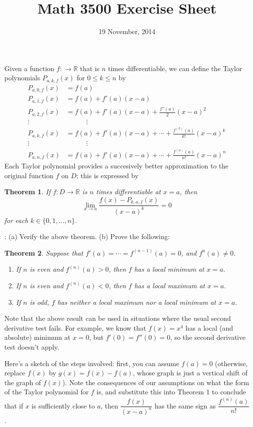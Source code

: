 \documentclass[letterpaper,12pt]{article}
\title{Math 3500 Exercise Sheet}
\date{19 November, 2014}
\newtheorem{theorem}{Theorem}
\newcommand{\R}{\mathbb{R}}
\begin{document}
\maketitle

Given a function $f:\to\R$ that is $n$ times differentiable, we can define the Taylor polynomials $P_{a,k,f}(x)$ for $0\leq k\leq n$ by
\begin{align*}
 P_{a,0,f}(x) &= f(a)\\
 P_{a,1,f}(x) &= f(a)+f'(a)(x-a)\\
 P_{a,2,f}(x) &= f(a)+f'(a)(x-a)+\frac{f''(a)}{2}(x-a)^2\\
 \vdots \quad & \quad \quad \quad \vdots \\
 P_{a,k,f}(x) &= f(a)+f'(a)(x-a)+\cdots+ \frac{f^{(k)}(a)}{k!}(x-a)^k\\
 \vdots \quad & \quad \quad \quad \vdots \\
 P_{a,n,f}(x) &= f(a)+f'(a)(x-a)+\cdots+ \frac{f^{(n)}(a)}{n!}(x-a)^n
\end{align*}
Each Taylor polynomial provides a succesively better approximation to the original function $f$ on $D$; this is expressed by
\begin{theorem}
 If $f:D\to\R$ is $n$ times differentiable at $x=a$, then
\[
 \lim_{x\to a}\frac{f(x)-P_{k,a,f}(x)}{(x-a)^k}=0
\]
for each $k\in\{0,1,\ldots, n\}$.
\end{theorem}
: (a) Verify the above theorem. (b) Prove the following:
\begin{theorem}
 Suppose that $f'(a)=\cdots = f^{(n-1)}(a)=0$, and $f^n(a)\neq 0$.
\begin{enumerate}
 \item If $n$ is even and $f^{(n)}(a)>0$, then $f$ has a local minimum at $x=a$.
 \item If $n$ is even and $f^{(n)}(a)<0$, then $f$ has a local maximum at $x=a$.
 \item If $n$ is odd, $f$ has neither a local maximum nor a local minimum at $x=a$.
\end{enumerate}
\end{theorem}
Note that the above result can be used in situations where the usual second derivative test fails. For example, we know that $f(x)=x^4$ has a local (and absolute) minimum at $x=0$, but $f'(0)=f''(0)=0$, so the second derivative test doesn't apply.

Here's a sketch of the steps involved: first, you can assume $f(a)=0$ (otherwise, replace $f(x)$ by $g(x)=f(x)-f(a)$, whose graph is just a vertical shift of the graph of $f(x)$). Note the consequences of our assumptions on what the form of the Taylor polynomial for $f$ is, and substitute this into Theorem 1 to conclude that if $x$ is sufficiently close to $a$, then $\dfrac{f(x)}{(x-a)^n}$ has the same sign as $\dfrac{f^{(n)}(a)}{n!}$.
\end{document}
